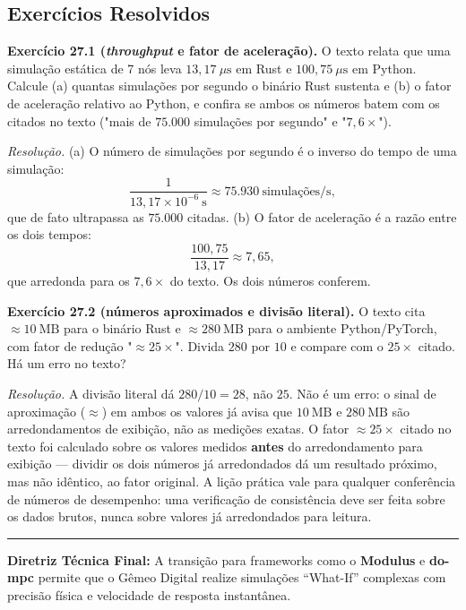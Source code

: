 \documentclass[12pt,a4paper]{article}
\numberwithin{equation}{section}
\numberwithin{table}{section}
\numberwithin{figure}{section}
\begin{document}
	\subsection{Exercícios Resolvidos}

	\textbf{Exercício 27.1 (\textit{throughput} e fator de aceleração).}
	O texto relata que uma simulação estática de 7 nós leva
	$13{,}17\ \mu\text{s}$ em Rust e $100{,}75\ \mu\text{s}$ em Python.
	Calcule (a) quantas simulações por segundo o binário Rust sustenta e
	(b) o fator de aceleração relativo ao Python, e confira se ambos os
	números batem com os citados no texto ("mais de $75.000$ simulações
	por segundo" e "$7{,}6\times$").

	\emph{Resolução.} (a) O número de simulações por segundo é o inverso
	do tempo de uma simulação:
	$$\frac{1}{13{,}17\times 10^{-6}\ \mathrm{s}} \approx 75{.}930\
	\text{simulações/s},$$
	que de fato ultrapassa as $75.000$ citadas. (b) O fator de aceleração
	é a razão entre os dois tempos:
	$$\frac{100{,}75}{13{,}17} \approx 7{,}65,$$
	que arredonda para os $7{,}6\times$ do texto. Os dois números
	conferem.

	\textbf{Exercício 27.2 (números aproximados e divisão literal).} O
	texto cita $\approx 10\ \text{MB}$ para o binário Rust e
	$\approx 280\ \text{MB}$ para o ambiente Python/PyTorch, com fator de
	redução "$\approx 25\times$". Divida $280$ por $10$ e compare com o
	$25\times$ citado. Há um erro no texto?

	\emph{Resolução.} A divisão literal dá $280/10 = 28$, não $25$. Não é
	um erro: o sinal de aproximação ($\approx$) em ambos os valores já
	avisa que $10\ \text{MB}$ e $280\ \text{MB}$ são arredondamentos de
	exibição,
	não as medições exatas. O fator $\approx 25\times$ citado no texto foi
	calculado sobre os valores medidos \textbf{antes} do arredondamento
	para exibição --- dividir os dois números já arredondados dá um
	resultado próximo, mas não idêntico, ao fator original. A lição
	prática vale para qualquer conferência de números de desempenho: uma
	verificação de consistência deve ser feita sobre os dados brutos,
	nunca sobre valores já arredondados para leitura.

	\vspace{1em}
	\hrule
	\vspace{1em}

	\textbf{Diretriz Técnica Final:} A transição para frameworks como o \textbf{Modulus} e \textbf{do-mpc} permite que o Gêmeo Digital realize simulações ``What-If'' complexas com precisão física e velocidade de resposta instantânea.
\end{document}
